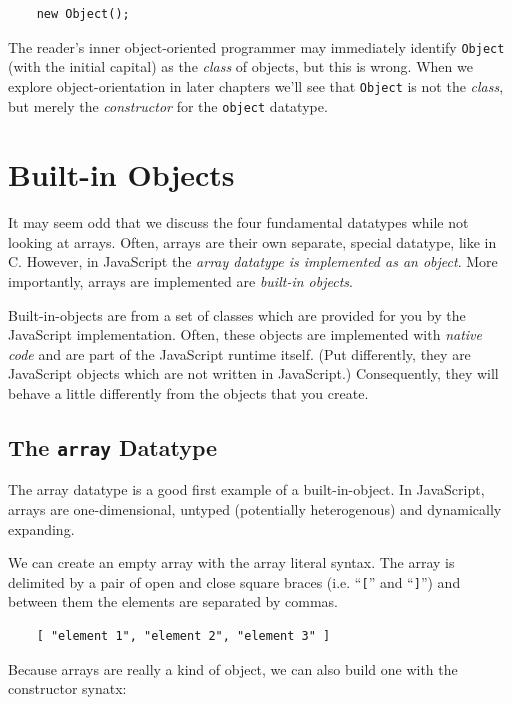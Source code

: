 \documentclass[11pt,letter]{book}
\begin{document}
    \begin{verbatim}
    new Object();
    \end{verbatim}
    
    The reader's inner object-oriented programmer may immediately identify \texttt{Object} (with the 
    initial capital) as the \emph{class} of objects, but this is wrong. When we explore 
    object-orientation in later chapters we'll see that \texttt{Object} is not the \emph{class}, but 
    merely the \emph{constructor} for the \texttt{object} datatype.
    
    \section{Built-in Objects}
    It may seem odd that we discuss the four fundamental datatypes while not looking at arrays.
    Often, arrays are their own separate, special datatype, like in C. However, in JavaScript the 
    \emph{array datatype is implemented as an object}. More importantly, arrays are implemented are 
    \emph{built-in objects}.
    
    Built-in-objects are from a set of classes which are provided for you by the JavaScript 
    implementation. Often, these objects are implemented with \emph{native code} and are part of 
    the JavaScript runtime itself. (Put differently, they are JavaScript objects which are not 
    written in JavaScript.) Consequently, they will behave a little differently from the objects 
    that you create.
    
    \subsection{The \texttt{array} Datatype}
    
    The array datatype is a good first example of a built-in-object. In JavaScript, arrays are 
    one-dimensional, untyped (potentially heterogenous) and dynamically expanding. 
    
    We can create an empty array with the array literal syntax. The array is delimited by a pair of 
    open and close square braces (i.e. ``\texttt{[}'' and ``\texttt{]}'') and between them the 
    elements are separated by commas.
    
    \begin{verbatim}
    [ "element 1", "element 2", "element 3" ]
    \end{verbatim}
    
    Because arrays are really a kind of object, we can also build one with the constructor synatx:
    
\end{document}
